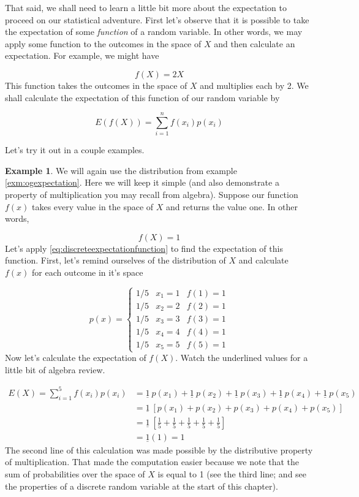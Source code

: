 \documentclass[
]{book}
\theoremstyle{definition}
\theoremstyle{definition}
\newtheorem{example}{Example}[chapter]
\theoremstyle{definition}
\theoremstyle{definition}
\theoremstyle{remark}
\begin{document}
That said, we shall need to learn a little bit more about the expectation to proceed on our statistical adventure. First let's observe that it is possible to take the expectation of some \emph{function} of a random variable. In other words, we may apply some function to the outcomes in the space of \(X\) and then calculate an expectation. For example, we might have

\[
f(X) = 2X
\]
This function takes the outcomes in the space of \(X\) and multiplies each by 2. We shall calculate the expectation of this function of our random variable by

\[
E(f(X)) = \sum_{i = 1}^{n} f(x_i)p(x_i)
\label{eq:discreteexpectationfunction}
\]

Let's try it out in a couple examples.

\begin{example}
\protect\hypertarget{exm:exp1}{}\label{exm:exp1}We will again use the distribution from example \ref{exm:ogexpectation}. Here we will keep it simple (and also demonstrate a property of multiplication you may recall from algebra). Suppose our function \(f(x)\) takes every value in the space of \(X\) and returns the value one. In other words,

\[
f(X) = 1
\]
Let's apply \eqref{eq:discreteexpectationfunction} to find the expectation of this function. First, let's remind ourselves of the distribution of \(X\) and calculate \(f(x)\) for each outcome in it's space

\[
p(x) =
\begin{cases}
1/5 & x_1 = 1 & f(1) = 1 \\
1/5 & x_2 = 2 & f(2) = 1 \\
1/5 & x_3 = 3 & f(3) = 1 \\
1/5 & x_4 = 4 & f(4) = 1 \\
1/5 & x_5 = 5 & f(5) = 1 
\end{cases}
\]
Now let's calculate the expectation of \(f(X)\). Watch the underlined values for a little bit of algebra review.

\begin{align}
E(X) = \sum_{i=1}^{5} f(x_i)p(x_i) &= \underline{1}\:p(x_1)+\underline{1}\:p(x_2)+\underline{1}\:p(x_3)+\underline{1}\:p(x_4)+\underline{1}\:p(x_5) \\
&= \underline{1}\:[p(x_1) + p(x_2) + p(x_3) + p(x_4) + p(x_5)] \\
&= \underline{1}\:[\frac{1}{5} + \frac{1}{5} + \frac{1}{5} + \frac{1}{5} + \frac{1}{5}] \\
&= \underline{1}(1) = 1
\end{align}
The second line of this calculation was made possible by the distributive property of multiplication. That made the computation easier because we note that the sum of probabilities over the space of \(X\) is equal to 1 (see the third line; and see the properties of a discrete random variable at the start of this chapter).
\end{example}
\end{document}
